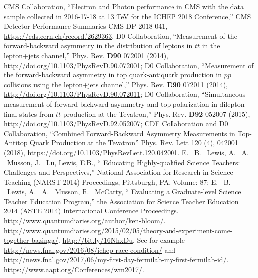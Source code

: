 \begin{thebibliography}{99}
%
    CMS Collaboration, ``Electron and Photon performance in CMS with the data sample collected in 2016-17-18 at 13 TeV for the ICHEP 2018 Conference,''
    CMS Detector Performance Summaries CMS-DP-2018-041, \url{https://cds.cern.ch/record/2629363}.
%
%
%
D0 Collaboration, ``Measurement of the forward-backward asymmetry in the distribution of leptons in $t\bar{t}$ in the lepton+jets channel,'' Phys. Rev. {\bf D90} 072001 (2014), \url{http://doi.org/10.1103/PhysRevD.90.072001};
D0 Collaboration, ``Measurement of the forward-backward asymmetry in top quark-antiquark production in $p\bar{p}$ collisions using the lepton+jets channel,'' Phys. Rev. {\bf D90} 072011 (2014), \url{http://doi.org/10.1103/PhysRevD.90.072011};
D0 Collaboration, ``Simultaneous measurement of forward-backward asymmetry and top polarization in dilepton final states from $t\bar{t}$ production at the Tevatron,'' Phys. Rev. {\bf D92} 052007 (2015), \url{http://doi.org/10.1103/PhysRevD.92.052007};
CDF Collaboration and D0 Collaboration, ``Combined Forward-Backward Asymmetry Measurements in Top-Antitop Quark Production at the Tevatron'' Phys. Rev. Lett 120 (4), 042001 (2018), \url{https://doi.org/10.1103/PhysRevLett.120.042001}.
%
%
E. ~B. ~Lewis, A. ~A. ~Musson, J. ~Lu, Lewis, E.B., `` Educating Highly-qualified Science Teachers: Challenges and Perspectives,” National Association for Research in Science Teaching (NARST 2014) Proceedings, Pittsburgh, PA, Volume: 87; 
E. ~B. ~Lewis, A. ~A. ~Musson, R. ~McCarty, `` Evaluating a Graduate-level Science Teacher Education Program,” the Association for Science Teacher Education 2014 (ASTE 2014) International Conference Proceedings.
%
 \url{http://www.quantumdiaries.org/author/ken-bloom/}.
%
 \url{http://www.quantumdiaries.org/2015/02/05/theory-and-experiment-come-together-bazinga/}.
%
 \url{http://bit.ly/16NhxDu}.
%
 See for example \url{http://news.fnal.gov/2016/08/ichep-race-condition/} and \url{http://news.fnal.gov/2017/06/my-first-day-fermilab-my-first-fermilab-id/}.
%
 \url{https://www.aapt.org/Conferences/wm2017/}.

\end{thebibliography}
